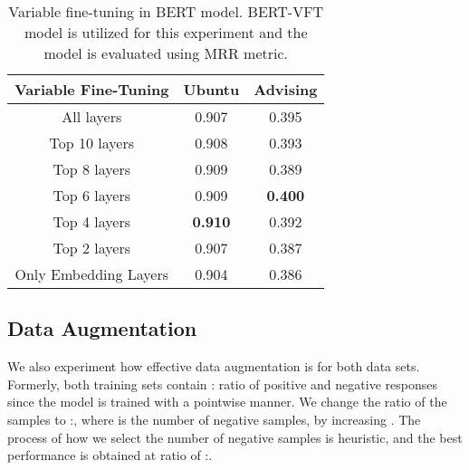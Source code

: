 \documentclass[a4paper]{article}
\begin{document}
\begin{table}[h]\centering
\vspace{-0.4cm}
\begin{adjustbox}{width=0.35\textwidth}
\centering
\renewcommand{\arraystretch}{1.1}

\begin{tabular}{c|cc}

\hline
\textbf{Variable Fine-Tuning} & \multicolumn{1}{c|}{\textbf{Ubuntu}} & \multicolumn{1}{c}{\textbf{Advising}} \\
\hline

\multicolumn{1}{c|}{All layers}  & \multicolumn{1}{c|}{0.907}   & 0.395\\
\multicolumn{1}{c|}{Top 10 layers}  & \multicolumn{1}{c|}{0.908}  & 0.393 \\
\multicolumn{1}{c|}{Top 8 layers}   & \multicolumn{1}{c|}{0.909}  & 0.389 \\
\multicolumn{1}{c|}{Top 6 layers}   & \multicolumn{1}{c|}{0.909}   & \textbf{0.400} \\
\multicolumn{1}{c|}{Top 4 layers}   & \multicolumn{1}{c|}{\textbf{0.910}} & 0.392 \\
\multicolumn{1}{c|}{Top 2 layers}   & \multicolumn{1}{c|}{0.907} & 0.387 \\
\multicolumn{1}{c|}{Only Embedding Layers}  & \multicolumn{1}{c|}{0.904} & 0.386 \\
\hline

\end{tabular}

\end{adjustbox}
\caption{Variable fine-tuning in BERT model. BERT-VFT model is utilized for this experiment and the model is evaluated using MRR metric.}
\label{table:variable_fine_tuning}
\vspace{-0.7cm}
\end{table}

\subsection{Data Augmentation}
\indent We also experiment how effective data augmentation is for both data sets. Formerly, both training sets contain : ratio of positive and negative responses since the model is trained with a pointwise manner. We change the ratio of the samples to :, where  is the number of negative samples, by increasing . The process of how we select the number of negative samples is heuristic, and the best performance is obtained at ratio of :.
\end{document}
